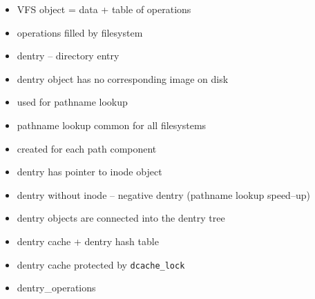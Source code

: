 \documentclass[30pt,a4paper,landscape,headrule,footrule]{foils}
\begin{document}

\begin{itemize}
\item VFS object = data + table of operations
\item operations filled by filesystem
\end{itemize}

\begin{itemize}
\item dentry -- directory entry
\item dentry object has no corresponding image on disk
\item used for pathname lookup
\item pathname lookup common for all filesystems
\item created for each path component
\item dentry has pointer to inode object
\end{itemize}

\begin{itemize}
\item dentry without inode -- negative dentry (pathname lookup speed--up)
\item dentry objects are connected into the dentry tree
\item dentry cache + dentry hash table
\item dentry cache protected by \texttt{dcache\_lock}
\item dentry\_operations
\end{itemize}
\end{document}
